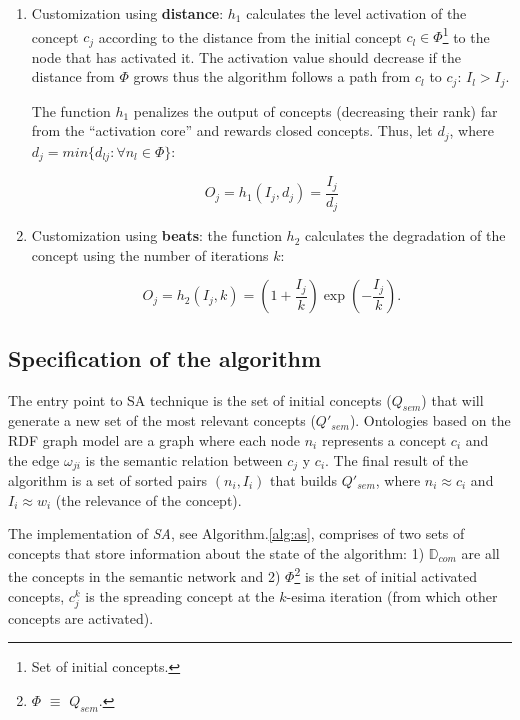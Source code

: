 \begin{description}
\begin{enumerate}
\item Customization using {\bf distance}: $h_1$ calculates the level activation
of the concept $c_j$  according to the distance from the initial concept $c_l
\in \Phi$\footnote{Set of initial concepts.} to the node that has activated it. The
activation value should decrease if the distance from $\Phi$ grows thus
the algorithm follows a path from $c_l$ to $c_j$: $I_l > I_j$.


The function $h_1$ penalizes the output of concepts (decreasing their rank)
far from the ``activation core'' and rewards closed concepts. Thus, let $d_j$,
where $d_j = min\{d_{lj}:\forall n_l \in \Phi\}$:


\begin{equation}
 O_j = h_1(I_j,d_j)= \frac{I_j} {d_j}
\end{equation}

\item Customization using {\bf beats}: the function $h_2$ calculates the
degradation of the concept using the number of iterations $k$:


\begin{equation}
 O_j = h_2(I_j,k) = (1+\frac{I_j}{k})\exp(-\frac{I_j}{k}).
\end{equation}

\end{enumerate}

\end{description}

\subsection{Specification of the algorithm}\label{impl-sa}

The entry point to SA technique is the set of initial concepts
($Q_{sem}$) that will generate a new set of the most relevant concepts
($Q'_{sem}$). Ontologies based on the RDF graph model are a graph where each node $n_i$ represents a concept
$c_i$ and the edge $\omega_{ji}$ is the semantic relation between $c_j$ y $c_i$.
The final result of the algorithm is a set of sorted pairs $(n_i, I_i)$
that builds $Q'_{sem}$, where $n_i\approx c_i$ and $I_i\approx w_i$ (the
relevance of the concept).

The implementation of \textit{SA}, see Algorithm.\ref{alg:as}, comprises of two sets of concepts that
store information about the state of the algorithm: 1)
$\mathbb{D}_{com}$ are all the concepts in the semantic network and 2)
$\Phi$\footnote{$\Phi$ $\equiv$ $Q_{sem}$.} is the set of initial activated concepts, $c_j^k$  is 
the spreading concept at the $k$-esima iteration (from which other concepts are activated).

